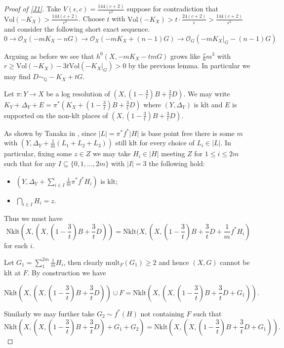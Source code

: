 \documentclass[a4paper,12pt]{book}
\newcommand{\Vol}{\text{Vol}}
\newcommand{\nklt}{\text{Nklt}}
\newcommand{\ox}{\mathcal{O}_{X}}
\begin{document}
\begin{proof}[Proof of \autoref{J1}]
	
	Take $V(\epsilon,c)=\frac{144(c+2)}{\epsilon^{2}}$ suppose for contradiction that $ \Vol(-K_{X}) > \frac{144(c+2)}{\epsilon^{2}}$. Choose $t$ with $\Vol(-K_{X})> t\cdot\frac{24(c+2)}{\epsilon} > \frac{144(c+2)}{\epsilon^{2}}$ and consider the following short exact sequence.
	\[0 \to \ox(-mK_{X}-nG)\to \ox(-mK_{X}+(n-1)G)\to \mathcal{O}_{G}(-mK_{X}|_{G}-(n-1)G)\]
	
	Arguing as before we see that $h^{0}(X,-mK_{X}-tmG)$ grows like $\frac{r}{6}m^{3}$ with $r\geq \Vol(-K_{X})-3t\Vol(-K_{X}|_{G}) >0$ by the previous lemma. In particular we may find $D \sim_{\mathbb{Q}} -K_{X}+tG$.
	
	Let $\pi\colon Y \to X$ be a log resolution of $(X, (1-\frac{3}{t})B+\frac{3}{t}D)$. We may write $K_{Y}+\Delta_{Y}+E=\pi^{*}(K_{X}+(1-\frac{3}{t})B+\frac{3}{t}D)$ where $(Y,\Delta_{Y})$ is klt and $E$ is supported on the non-klt places of $(X, (1-\frac{3}{t})B+\frac{3}{t}D)$. 
	
	As shown by Tanaka in \cite[Theorem 1]{tanaka2017semiample}, since $|L|=\pi^{*}f^{*}|H|$ is base point free there is some $m$ with $(Y,\Delta_{Y}+\frac{1}{m}(L_{1}+L_{2}+L_{3}))$	 still klt for every choice of $L_{i} \in |L|$. In particular, fixing some $z\in Z$ we may take $H_{i} \in |H|$ meeting $Z$ for $1\leq  i \leq 2m$ such that for any $I \subseteq \{0,1,...,2m\}$ with $|I| =3$ the following hold:
	
	\begin{itemize}
		\item $(Y,\Delta_{Y}+\sum_{i \in I}\frac{1}{m}\pi^{*}f^{*}H_{i})$ is klt;
		\item $\bigcap_{i\in I} H_{i}={z}$.
	\end{itemize} 
	
	Thus we must have 
	\[\nklt(X, (X, (1-\frac{3}{t})B+\frac{3}{t}D))=\nklt(X, (X, (1-\frac{3}{t})B+\frac{3}{t}D+\frac{1}{m}f^{*}H_{i})\]
	for each $i$. 
	
	Let $G_{1} = \sum_{1}^{2m} \frac{1}{m}H_{i}$, then clearly $\text{mult}_{F}(G_{1}) \geq 2$ and hence $(X,G)$ cannot be klt at $F$. By construction we have
	
	\[\nklt(X, (X, (1-\frac{3}{t})B+\frac{3}{t}D)) \cup F = \nklt(X, (X, (1-\frac{3}{t})B+\frac{3}{t}D+G_{1})).\]
	
	Similarly we may further take $G_{2} \sim f^{*}(H)$ not containing $F$ such that
	\[\nklt(X, (X, (1-\frac{3}{t})B+\frac{3}{t}D)+G_{1}+G_{2}) = \nklt(X, (X, (1-\frac{3}{t})B+\frac{3}{t}D+G_{1})).\]
	

\end{proof}
\end{document}
